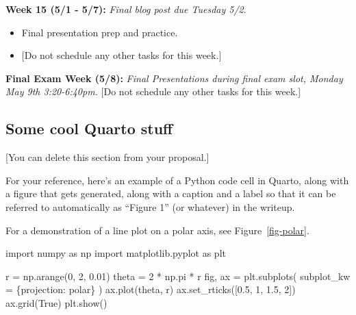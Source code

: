 \documentclass[
  letterpaper,
  DIV=11,
  numbers=noendperiod]{scrartcl}
\newenvironment{Shaded}{\begin{snugshade}}{\end{snugshade}}
\newcommand{\DecValTok}[1]{\textcolor[rgb]{0.68,0.00,0.00}{#1}}
\newcommand{\FloatTok}[1]{\textcolor[rgb]{0.68,0.00,0.00}{#1}}
\newcommand{\ImportTok}[1]{\textcolor[rgb]{0.00,0.46,0.62}{#1}}
\newcommand{\NormalTok}[1]{\textcolor[rgb]{0.00,0.23,0.31}{#1}}
\newcommand{\OperatorTok}[1]{\textcolor[rgb]{0.37,0.37,0.37}{#1}}
\newcommand{\StringTok}[1]{\textcolor[rgb]{0.13,0.47,0.30}{#1}}
\newcommand{\VariableTok}[1]{\textcolor[rgb]{0.07,0.07,0.07}{#1}}
\begin{document}
\textbf{Week 15 (5/1 - 5/7):} \emph{Final blog post due Tuesday 5/2}.

\begin{itemize}
\item
  Final presentation prep and practice.
\item
  {[}Do not schedule any other tasks for this week.{]}
\end{itemize}

\textbf{Final Exam Week (5/8):} \emph{Final Presentations during final
exam slot, Monday May 9th 3:20-6:40pm.} {[}Do not schedule any other
tasks for this week.{]}

\hypertarget{some-cool-quarto-stuff}{%
\subsection{Some cool Quarto stuff}\label{some-cool-quarto-stuff}}

{[}You can delete this section from your proposal.{]}

For your reference, here's an example of a Python code cell in Quarto,
along with a figure that gets generated, along with a caption and a
label so that it can be referred to automatically as ``Figure 1'' (or
whatever) in the writeup.

For a demonstration of a line plot on a polar axis, see
Figure~\ref{fig-polar}.

\begin{Shaded}
\begin{Highlighting}[]
\ImportTok{import}\NormalTok{ numpy }\ImportTok{as}\NormalTok{ np}
\ImportTok{import}\NormalTok{ matplotlib.pyplot }\ImportTok{as}\NormalTok{ plt}

\NormalTok{r }\OperatorTok{=}\NormalTok{ np.arange(}\DecValTok{0}\NormalTok{, }\DecValTok{2}\NormalTok{, }\FloatTok{0.01}\NormalTok{)}
\NormalTok{theta }\OperatorTok{=} \DecValTok{2} \OperatorTok{*}\NormalTok{ np.pi }\OperatorTok{*}\NormalTok{ r}
\NormalTok{fig, ax }\OperatorTok{=}\NormalTok{ plt.subplots(}
\NormalTok{  subplot\_kw }\OperatorTok{=}\NormalTok{ \{}\StringTok{\textquotesingle{}projection\textquotesingle{}}\NormalTok{: }\StringTok{\textquotesingle{}polar\textquotesingle{}}\NormalTok{\} }
\NormalTok{)}
\NormalTok{ax.plot(theta, r)}
\NormalTok{ax.set\_rticks([}\FloatTok{0.5}\NormalTok{, }\DecValTok{1}\NormalTok{, }\FloatTok{1.5}\NormalTok{, }\DecValTok{2}\NormalTok{])}
\NormalTok{ax.grid(}\VariableTok{True}\NormalTok{)}
\NormalTok{plt.show()}
\end{Highlighting}
\end{Shaded}
\end{document}
